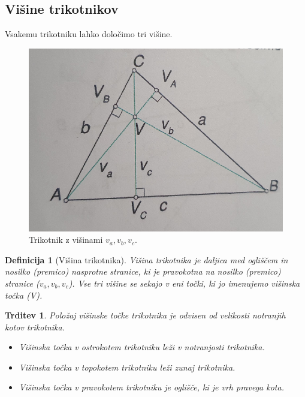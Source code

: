 \documentclass{article}
\newtheorem{definicija}{Definicija}[subsection]
\newtheorem{trditev}{Trditev}[subsection]
\begin{document}
\pagebreak
\subsection{ Višine trikotnikov }

Vsakemu trikotniku lahko določimo tri višine.

\begin{figure}[h]
    \includegraphics[width=\linewidth]{visineTrikotnika.png}
    \centering
    \caption{Trikotnik z višinami $v_a, v_b, v_c$.}
\end{figure}

\begin{definicija}[Višina trikotnika]
    Višina trikotnika je daljica med ogliščem in nosilko (premico) nasprotne stranice, ki je pravokotna na nosilko (premico) stranice ($v_a, v_b, v_c$). Vse tri višine se sekajo v eni točki, ki jo imenujemo višinska točka (V).
\end{definicija}

\begin{trditev}
    Položaj višinske točke trikotnika je odvisen od velikosti notranjih kotov trikotnika.
    \begin{itemize}
        \item Višinska točka v ostrokotem trikotniku leži v notranjosti trikotnika.
        \item Višinska točka v topokotem trikotniku leži zunaj trikotnika.
        \item Višinska točka v pravokotem trikotniku je oglišče, ki je vrh pravega kota. 
    \end{itemize}
\end{trditev}
\end{document}
